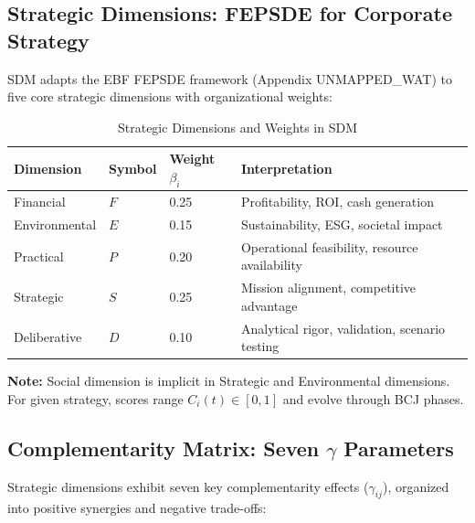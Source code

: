 \subsection{Strategic Dimensions: FEPSDE for Corporate Strategy}
\label{subsec:sdm-dimensions}

SDM adapts the EBF FEPSDE framework (Appendix UNMAPPED_WAT) to five core strategic dimensions with organizational weights:

\begin{table}[htbp]
\centering
\caption{Strategic Dimensions and Weights in SDM}
\label{tab:sdm-dimensions}
\renewcommand{\arraystretch}{1.4}
\begin{tabular}{@{}lllp{5cm}@{}}
\toprule
\textbf{Dimension} & \textbf{Symbol} & \textbf{Weight $\beta_i$} & \textbf{Interpretation} \\
\midrule
Financial & $F$ & 0.25 & Profitability, ROI, cash generation \\
Environmental & $E$ & 0.15 & Sustainability, ESG, societal impact \\
Practical & $P$ & 0.20 & Operational feasibility, resource availability \\
Strategic & $S$ & 0.25 & Mission alignment, competitive advantage \\
Deliberative & $D$ & 0.10 & Analytical rigor, validation, scenario testing \\
\bottomrule
\end{tabular}
\end{table}

\textbf{Note:} Social dimension is implicit in Strategic and Environmental dimensions. For given strategy, scores range $C_i(t) \in [0,1]$ and evolve through BCJ phases.

\subsection{Complementarity Matrix: Seven $\gamma$ Parameters}
\label{subsec:sdm-gamma}

Strategic dimensions exhibit seven key complementarity effects ($\gamma_{ij}$), organized into positive synergies and negative trade-offs:

